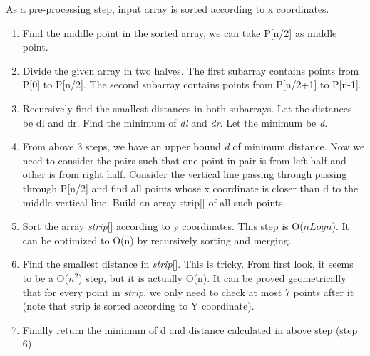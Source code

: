\documentclass[12pt]{article}
\begin{document}
As a pre-processing step, input array is sorted according to x coordinates.

\begin{enumerate}
    \item Find the middle point in the sorted array, we can take P[n/2] as middle point.
    \item Divide the given array in two halves. The first subarray contains points from P[0] to P[n/2]. The second subarray contains points from P[n/2+1] to P[n-1].
    \item  Recursively find the smallest distances in both subarrays. Let the distances be dl and dr. Find the minimum of \textit{dl} and \textit{dr}. Let the minimum be \textit{d}.
    \item  From above 3 steps, we have an upper bound \textit{d} of minimum distance. Now we need to consider the pairs such that one point in pair is from left half and other is from right half. Consider the vertical line passing through passing through P[n/2] and find all points whose x coordinate is closer than d to the middle vertical line. Build an array strip[] of all such points.
    \item Sort the array \textit{strip}[] according to y coordinates. This step is O(\begin{math}nLogn\end{math}). It can be optimized to O(n) by recursively sorting and merging.
    \item Find the smallest distance in \textit{strip}[]. This is tricky. From first look, it seems to be a O(\begin{math}n^2\end{math}) step, but it is actually O(n). It can be proved geometrically that for every point in \textit{strip}, we only need to check at most 7 points after it (note that strip is sorted according to Y coordinate).
    \item Finally return the minimum of d and distance calculated in above step (step 6)
\end{enumerate}
\end{document}
